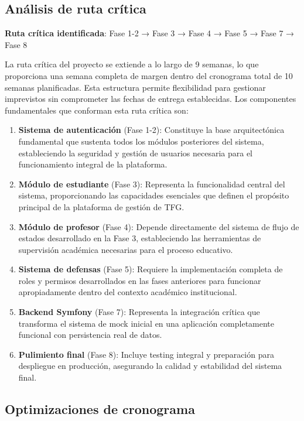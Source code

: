 \documentclass[12pt,a4paper,oneside]{report}
\providecommand{\tightlist}{%
  \setlength{\itemsep}{0pt}\setlength{\parskip}{0pt}}
\begin{document}
\subsection{Análisis de ruta
crítica}\label{anuxe1lisis-de-ruta-cruxedtica}

\textbf{Ruta crítica identificada}: Fase 1-2 → Fase 3 → Fase 4 → Fase 5 → Fase 7 → Fase 8

La ruta crítica del proyecto se extiende a lo largo de 9 semanas, lo que proporciona una semana completa de margen dentro del cronograma total de 10 semanas planificadas. Esta estructura permite flexibilidad para gestionar imprevistos sin comprometer las fechas de entrega establecidas. Los componentes fundamentales que conforman esta ruta crítica son:

\begin{enumerate}
\def\labelenumi{\arabic{enumi}.}
\tightlist
\item
  \textbf{Sistema de autenticación} (Fase 1-2): Constituye la base arquitectónica fundamental que sustenta todos los módulos posteriores del sistema, estableciendo la seguridad y gestión de usuarios necesaria para el funcionamiento integral de la plataforma.
\item
  \textbf{Módulo de estudiante} (Fase 3): Representa la funcionalidad central del sistema, proporcionando las capacidades esenciales que definen el propósito principal de la plataforma de gestión de TFG.
\item
  \textbf{Módulo de profesor} (Fase 4): Depende directamente del sistema de flujo de estados desarrollado en la Fase 3, estableciendo las herramientas de supervisión académica necesarias para el proceso educativo.
\item
  \textbf{Sistema de defensas} (Fase 5): Requiere la implementación completa de roles y permisos desarrollados en las fases anteriores para funcionar apropiadamente dentro del contexto académico institucional.
\item
  \textbf{Backend Symfony} (Fase 7): Representa la integración crítica que transforma el sistema de mock inicial en una aplicación completamente funcional con persistencia real de datos.
\item
  \textbf{Pulimiento final} (Fase 8): Incluye testing integral y preparación para despliegue en producción, asegurando la calidad y estabilidad del sistema final.
\end{enumerate}

\subsection{Optimizaciones de
cronograma}\label{optimizaciones-de-cronograma}
\end{document}
